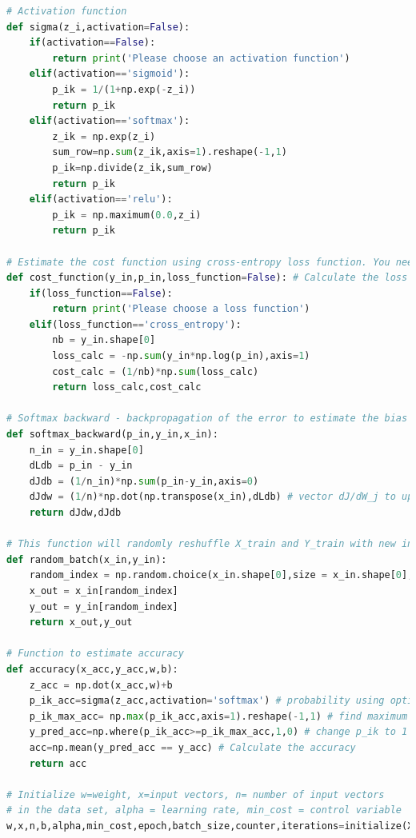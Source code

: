 \documentclass{article}
\begin{document}
\begin{lstlisting}[language=Python]
# Activation function
def sigma(z_i,activation=False):
    if(activation==False):
        return print('Please choose an activation function')
    elif(activation=='sigmoid'):
        p_ik = 1/(1+np.exp(-z_i))
        return p_ik
    elif(activation=='softmax'):
        z_ik = np.exp(z_i)
        sum_row=np.sum(z_ik,axis=1).reshape(-1,1)
        p_ik=np.divide(z_ik,sum_row)
        return p_ik
    elif(activation=='relu'):
        p_ik = np.maximum(0.0,z_i)
        return p_ik
        
# Estimate the cost function using cross-entropy loss function. You need to define which type of loss function to use: cost_function(y_train,p_i,loss_function='cross_entropy')
def cost_function(y_in,p_in,loss_function=False): # Calculate the loss and cost function using entering arrays
    if(loss_function==False):
        return print('Please choose a loss function')
    elif(loss_function=='cross_entropy'):
        nb = y_in.shape[0]
        loss_calc = -np.sum(y_in*np.log(p_in),axis=1)
        cost_calc = (1/nb)*np.sum(loss_calc)
        return loss_calc,cost_calc

# Softmax backward - backpropagation of the error to estimate the bias and weights
def softmax_backward(p_in,y_in,x_in):
    n_in = y_in.shape[0]
    dLdb = p_in - y_in
    dJdb = (1/n_in)*np.sum(p_in-y_in,axis=0)
    dJdw = (1/n)*np.dot(np.transpose(x_in),dLdb) # vector dJ/dW_j to update w_j
    return dJdw,dJdb
    
# This function will randomly reshuffle X_train and Y_train with new indexes for the 
def random_batch(x_in,y_in):
    random_index = np.random.choice(x_in.shape[0],size = x_in.shape[0], replace= False)
    x_out = x_in[random_index]
    y_out = y_in[random_index]
    return x_out,y_out

# Function to estimate accuracy   
def accuracy(x_acc,y_acc,w,b):
    z_acc = np.dot(x_acc,w)+b
    p_ik_acc=sigma(z_acc,activation='softmax') # probability using optimized parameters
    p_ik_max_acc= np.max(p_ik_acc,axis=1).reshape(-1,1) # find maximum for each row and reshape to column
    y_pred_acc=np.where(p_ik_acc>=p_ik_max_acc,1,0) # change p_ik to 1 in case the element of the row is >= maximum for row.
    acc=np.mean(y_pred_acc == y_acc) # Calculate the accuracy
    return acc
    
# Initialize w=weight, x=input vectors, n= number of input vectors 
# in the data set, alpha = learning rate, min_cost = control variable
w,x,n,b,alpha,min_cost,epoch,batch_size,counter,iterations=initialize(X_train,Y_train)


\end{lstlisting}
\end{document}
